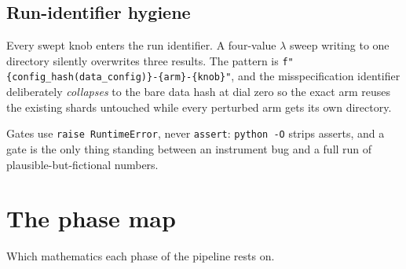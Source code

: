 \documentclass[11pt,a4paper]{article}
\theoremstyle{plain}
\theoremstyle{definition}
\theoremstyle{remark}
\newcommand{\code}[1]{\texttt{\small #1}}
\begin{document}
\subsection{Run-identifier hygiene}

Every swept knob enters the run identifier. A four-value $\lambda$ sweep writing to one
directory silently overwrites three results. The pattern is
\code{f"\{config\_hash(data\_config)\}-\{arm\}-\{knob\}"}, and the misspecification
identifier deliberately \emph{collapses} to the bare data hash at dial zero so the exact
arm reuses the existing shards untouched while every perturbed arm gets its own directory.

Gates use \code{raise RuntimeError}, never \code{assert}: \code{python -O} strips asserts,
and a gate is the only thing standing between an instrument bug and a full run of
plausible-but-fictional numbers.

\section{The phase map}
\label{sec:phasemap}

Which mathematics each phase of the pipeline rests on.
\end{document}
